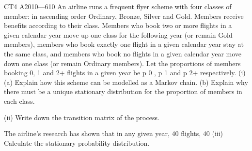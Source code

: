 CT4 A2010—610
An airline runs a frequent flyer scheme with four classes of member: in ascending
order Ordinary, Bronze, Silver and Gold. Members receive benefits according to their
class. Members who book two or more flights in a given calendar year move up one
class for the following year (or remain Gold members), members who book exactly
one flight in a given calendar year stay at the same class, and members who book no
flights in a given calendar year move down one class (or remain Ordinary members).
Let the proportions of members booking 0, 1 and 2+ flights in a given year be p 0 , p 1
and p 2+ respectively.
(i)
(a) Explain how this scheme can be modelled as a Markov chain.
(b) Explain why there must be a unique stationary distribution for the
proportion of members in each class.
 
(ii)
Write down the transition matrix of the process.
 
The airline’s research has shown that in any given year, 40%
flights, 40%
(iii)
Calculate the stationary probability distribution.
 
